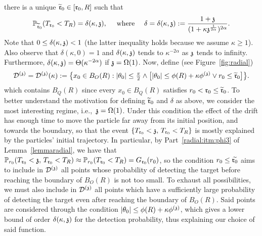 there is a unique $\widetilde{\rabs}_0\in [\rabs_0,R]$ such that
\begin{equation}\label{eqn:radial-defrtilde}
\PP_{\widetilde{\rabs}_0}(T_{\rabs_0}<T_R)=
\delta(\kappa,\ss), 
\quad\text{ where }\quad
\delta=\delta(\kappa,\ss):= \frac{1+\ss}{(1+\kappa\ss^{\frac{1}{2\alpha}})^{2\alpha}}.
\end{equation}
Note that $0\leq\delta(\kappa,\ss)< 1$ (the latter inequality holds because we assume $\kappa\geq 1$). Also observe that $\delta(\kappa,0)=1$ and $\delta(\kappa,\ss)$ tends to $\kappa^{-2\alpha}$ as $\ss$ tends to infinity.
Furthermore, $\delta(\kappa,\ss)=\Theta(\kappa^{-2\alpha})$ if $\ss=\Omega(1)$.
Now, define (see Figure~\ref{fig:radial}) 
\[
\dt = \dt(\kappa) := \big\{ x_0\in B_O(R) : |\theta_0|\leq\tfrac{\pi}{2} \wedge \big[|\theta_0|\leq\phi(R)+\kappa\phi^{(\ss)} \vee  r_0\leq\widetilde{\rabs}_0\big]\big\}.
\]
which contains $B_Q(R)$ since every $x_0\in B_Q(R)$ satisfies $r_0<\rabs_0\leq\widetilde{\rabs}_0$.
To better understand the motivation for defining $\widetilde{\rabs}_0$ and $\delta$ as above, we consider the most interesting regime, i.e.,~$\ss=\Omega(1)$. Under this condition the effect of the drift has enough time to move the particle far away from its initial position, and towards the boundary, so that the event $\{T_{\rabs_0}<\ss,\,T_{\rabs_0}<T_R\}$ is mostly explained by the particles' initial trajectory. In particular, by Part~\eqref{radial:itm:phi3} of Lemma~\ref{lemmaradial}, we have that $\PP_{r_0}(T_{\rabs_0}<\ss,\,T_{\rabs_0}<T_R)\approx \PP_{r_0}(T_{\rabs_0}<T_R)=G_{\rabs_0}(r_0)$,  so the condition $r_0\leq\widetilde{\rabs_0}$ aims to include in $\dt$ all points whose probability of detecting the target before reaching the boundary of $B_O(R)$ is not too small. To exhaust all possibilities, we must also include in $\dt$ all points which have a sufficiently large probability of detecting the target even after reaching the boundary of $B_O(R)$. Said points are considered through the condition $|\theta_0|\leq\phi(R)+\kappa\phi^{(\ss)}$, which gives a lower bound of order $\delta(\kappa,\ss)$ for the detection probability, thus explaining our choice of said function.
